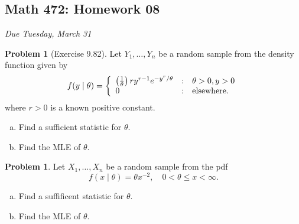 \documentclass[10pt]{article}
\theoremstyle{definition}
\newtheorem{problem}[theorem]{Problem}
\newcommand{\1}[1]{\textbf{1}_{\left[#1\right]}} %
\begin{document}
\begin{center}
  \section*{Math 472: Homework 08}
  \textit{Due Tuesday, March 31}
\end{center}


\begin{problem}[Exercise 9.82]
  Let $Y_{1},\ldots,Y_{n}$ be a random sample from the density function given
  by
  \begin{equation*}
    f(y\mid \theta)  = \left\{
      \begin{array}{l@{\quad:\quad}l}
        \left( \frac{1}{\theta} \right)r y^{r-1}e^{-y^{r}/\theta}
        & \theta>0, y>0\\
        0& \text{elsewhere.}\end{array}\right.
  \end{equation*}
  where $r>0$ is a known positive constant.
  \begin{enumerate}[(a)]
    \item Find a sufficient statistic for $\theta$.
    \item Find the MLE of $\theta$. 
  \end{enumerate}
\end{problem}


\begin{problem}
  Let $X_{1},\ldots,X_{n}$ be a random sample from the pdf
  \begin{equation*}
    f(x\mid \theta) = \theta x^{-2}, \quad 0<\theta \leq x <\infty.
  \end{equation*}
  \begin{enumerate}[(a)]
    \item Find a suffificent statistic for $\theta$. 
    \item Find the MLE of $\theta$. 
  \end{enumerate}
\end{problem}
\end{document}
